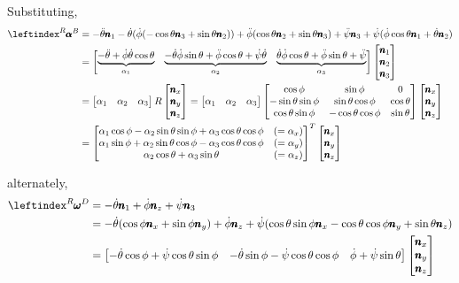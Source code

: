 Substituting,
\begin{align*}
    \lx{^R}{\pmb \alpha}^B &=
       - \ddot \theta \pmb n_1 - \dot \theta (\dot \phi (-\cos \theta \pmb n_3 +\sin \theta  \pmb n_2) )
       + \ddot \phi (\cos \theta \pmb n_2 + \sin \theta \pmb n_3)
       + \ddot \psi \pmb n_3 + \dot \psi ( \dot \phi \cos \theta \pmb n_1 + \dot \theta \pmb n_2)\\
       &= \bm{
            \underbrace{
            -\ddot \theta + \dot \phi \dot \theta \cos \theta}_{\alpha_1} &
            \underbrace{
            -\dot \theta \dot \phi \sin \theta + \ddot \phi \cos \theta + \dot \psi \dot \theta }_{\alpha_2} &
            \underbrace{
            \dot \theta \dot \phi \cos \theta + \ddot \phi \sin \theta + \ddot \psi}_{\alpha_3}}
       \bm{\pmb n_1 \\ \pmb n_2 \\ \pmb n_3}\\
       &= \bm{\alpha_1 & \alpha_2 & \alpha_3} R
       \bm{\pmb n_x \\ \pmb n_y \\ \pmb n_z}
        = \bm{\alpha_1 & \alpha_2 & \alpha_3}
          \bm{\cos \phi & \sin \phi & 0\\
              -\sin \theta \sin \phi & \sin \theta \cos \phi & \cos \theta\\
              \cos \theta \sin \phi & -\cos \theta \cos \phi & \sin \theta}
            \bm{\pmb n_x \\ \pmb n_y \\ \pmb n_z}\\
        &= \bm{
            \alpha _1 \cos \phi - \alpha_2 \sin \theta \sin \phi + \alpha_3 \cos \theta \cos \phi &(=\alpha_x) \\
            \alpha_1 \sin \phi + \alpha_2 \sin \theta \cos \phi - \alpha_3 \cos \theta \cos \phi & (= \alpha_y)\\
            \alpha_2 \cos \theta + \alpha_3 \sin \theta & (=\alpha_z)}^T
        \bm{\pmb n_x \\ \pmb n_y \\ \pmb n_z}
\end{align*}

alternately,
\begin{align*}
    \lx{^R}{\pmb \omega}^D &= - \dot \theta \pmb n_1 + \dot \phi \pmb n_z + \dot \psi \pmb n_3\\
    &=-\dot \theta (\cos \phi \pmb n_x + \sin \phi \pmb n_y) + \dot \phi \pmb n_z + \dot \psi (\cos \theta \sin \phi \pmb n_x  -\cos \theta \cos \phi \pmb n_y  + \sin \theta \pmb n_z)\\
    &=\bm{-\dot \theta \cos \phi + \dot \psi \cos \theta \sin \phi &
         -\dot \theta \sin \phi - \dot \psi \cos \theta \cos \phi &
         \dot \phi + \dot \psi \sin \theta }
        \bm{\pmb n_x \\ \pmb n_y \\ \pmb n_z}
\end{align*}

